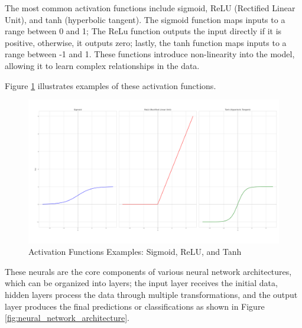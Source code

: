 The most common activation functions include sigmoid, ReLU (Rectified Linear Unit), and tanh (hyperbolic tangent). The sigmoid function maps inputs to a range between 0 and 1; The ReLu function outputs the input directly if it is positive, otherwise, it outputs zero; lastly, the tanh function maps inputs to a range between -1 and 1. These functions introduce non-linearity into the model, allowing it to learn complex relationships in the data.

Figure \ref{fig:activation_function} illustrates examples of these activation functions.

\newpage
\begin{figure}
    \centering
    \includegraphics[width=1\textwidth]{figuras/2-fundamentos/activationFunctions.png}
    \caption{Activation Functions Examples: Sigmoid, ReLU, and Tanh}
    \label{fig:activation_function}
    \end{figure}

    These neurals are the core components of various neural network architectures, which can be organized into layers; the input layer receives the initial data, hidden layers process the data through multiple transformations, and the output layer produces the final predictions or classifications as shown in Figure \ref{fig:neural_network_architecture}. 
    
